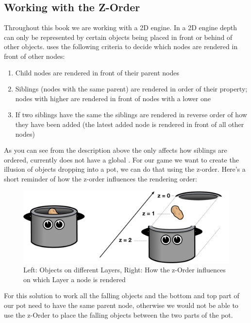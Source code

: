 \subsection{Working with the Z-Order}\label{z-order-intro}
Throughout this book we are working with a 2D engine. In a 2D engine depth can
only be represented by certain objects being placed in front or behind of other
objects. \cocos{} uses the following criteria to decide which nodes are rendered
in front of other nodes:
\begin{enumerate}
  \item Child nodes are rendered in front of their parent nodes
  \item Siblings (nodes with the same parent) are rendered in order of their
   property; nodes with higher  are
  rendered in front of nodes with a lower one
  \item If two siblings have the same  the siblings are
  rendered in reverse order of how they have been added (the latest added node
  is rendered in front of all other nodes)
\end{enumerate}

As you can see from the description above the  only affects
how siblings are ordered, \cocos{} currently does not have a global
. For our game we want to create the illusion of objects
dropping into a pot, we can do that using the \cocos{} z-order. Here's a short
reminder of how the z-order influences the rendering order:

\begin{figure}[H]
    \centering
    \includegraphics[width=0.9\linewidth]{images/Chapter3/drawing_order.png}
    \caption{Left: Objects on different Layers, Right: How the z-Order
    influences on which Layer a node is rendered}
\end{figure}

For this solution to work all the falling objects and the bottom and top part of
our pot need to have the same parent node, otherwise we would not be able to use
the z-Order to place the falling objects between the two parts of the pot. 

